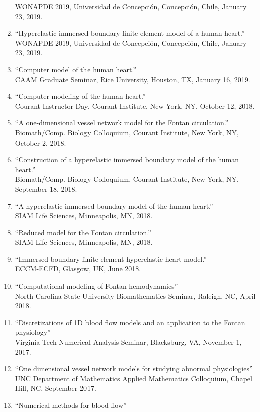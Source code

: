 \documentclass{article} %
\begin{document}
\begin{enumerate}
WONAPDE 2019, Universidad de Concepci\'on, Concepci\'on, Chile, January 23, 2019.
\item ``Hyperelastic immersed boundary finite element model of a human heart.'' \\
WONAPDE 2019, Universidad de Concepci\'on, Concepci\'on, Chile, January 23, 2019.
\item ``Computer model of the human heart.'' \\
CAAM Graduate Seminar, Rice University, Houston, TX, January 16, 2019.
\item ``Computer modeling of the human heart.'' \\
Courant Instructor Day, Courant Institute, New York, NY, October 12, 2018.
\item ``A one-dimensional vessel network model for the Fontan circulation.'' \\Biomath/Comp. Biology Colloquium, Courant Institute, New York, NY, October 2, 2018.
\item ``Construction of a hyperelastic immersed boundary model of the human heart.'' \\Biomath/Comp. Biology Colloquium, Courant Institute, New York, NY, September 18, 2018.
\item ``A hyperelastic immersed boundary model of the human heart.''\\ SIAM Life Sciences, Minneapolis, MN, 2018.
\item ``Reduced model for the Fontan circulation.''\\ SIAM Life Sciences, Minneapolis, MN, 2018.
\item ``Immersed boundary finite element hyperelastic heart model.'' \\
ECCM-ECFD, Glasgow, UK, June 2018.
\item ``Computational modeling of Fontan hemodynamics'' \\
North Carolina State University Biomathematics Seminar, Raleigh, NC, April 2018.
\item ``Discretizations of 1D blood flow models and an application to the Fontan physiology'' \\
Virginia Tech Numerical Analysis Seminar, Blacksburg, VA, November 1, 2017.
\item ``One dimensional vessel network models for studying abnormal physiologies'' \\
UNC Department of Mathematics Applied Mathematics Colloquium, Chapel Hill, NC, September 2017.
\item ``Numerical methods for blood flow'' \\

\end{enumerate}
\end{document}
